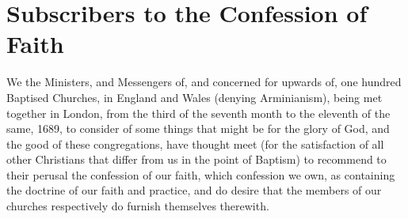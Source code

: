 \documentclass[12pt,a4paper]{book}
\begin{document}
\chapter{Subscribers to the Confession of Faith}
We the Ministers, and Messengers of, and concerned for upwards of, one hundred Baptised Churches, in England and Wales (denying Arminianism), being met together in London, from the third of the seventh month to the eleventh of the same, 1689, to consider of some things that might be for the glory of God, and the good of these congregations, have thought meet (for the satisfaction of all other Christians that differ from us in the point of Baptism) to recommend to their perusal the confession of our faith, which confession we own, as containing the doctrine of our faith and practice, and do desire that the members of our churches respectively do furnish themselves therewith.
\end{document}

